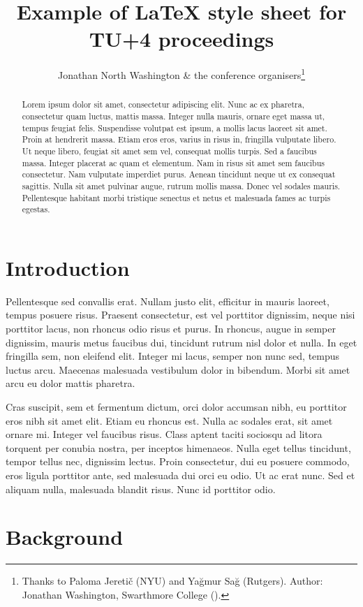 \documentclass[12pt,letterpaper]{article}
\title{Example of \LaTeX{} style sheet for TU+4 proceedings}
\author{Jonathan North Washington \& the conference organisers\thanks{
	Thanks to Paloma Jeretič (NYU) and Yağmur Sağ (Rutgers).
	Author: Jonathan Washington, Swarthmore College (\email{jonathan.washington@swarthmore.edu}).
}}
\begin{document}
\maketitle

\begin{abstract}
Lorem ipsum dolor sit amet, consectetur adipiscing elit. Nunc ac ex pharetra, consectetur quam luctus, mattis massa. Integer nulla mauris, ornare eget massa ut, tempus feugiat felis. Suspendisse volutpat est ipsum, a mollis lacus laoreet sit amet. Proin at hendrerit massa. Etiam eros eros, varius in risus in, fringilla vulputate libero. Ut neque libero, feugiat sit amet sem vel, consequat mollis turpis. Sed a faucibus massa. Integer placerat ac quam et elementum. Nam in risus sit amet sem faucibus consectetur. Nam vulputate imperdiet purus. Aenean tincidunt neque ut ex consequat sagittis. Nulla sit amet pulvinar augue, rutrum mollis massa. Donec vel sodales mauris. Pellentesque habitant morbi tristique senectus et netus et malesuada fames ac turpis egestas.
\end{abstract}


\section{Introduction}

Pellentesque sed convallis erat. Nullam justo elit, efficitur in mauris laoreet, tempus posuere risus. Praesent consectetur, est vel porttitor dignissim, neque nisi porttitor lacus, non rhoncus odio risus et purus. In rhoncus, augue in semper dignissim, mauris metus faucibus dui, tincidunt rutrum nisl dolor et nulla. In eget fringilla sem, non eleifend elit. Integer mi lacus, semper non nunc sed, tempus luctus arcu. Maecenas malesuada vestibulum dolor in bibendum. Morbi sit amet arcu eu dolor mattis pharetra.

Cras suscipit, sem et fermentum dictum, orci dolor accumsan nibh, eu porttitor eros nibh sit amet elit. Etiam eu rhoncus est. Nulla ac sodales erat, sit amet ornare mi. Integer vel faucibus risus. Class aptent taciti sociosqu ad litora torquent per conubia nostra, per inceptos himenaeos. Nulla eget tellus tincidunt, tempor tellus nec, dignissim lectus. Proin consectetur, dui eu posuere commodo, eros ligula porttitor ante, sed malesuada dui orci eu odio. Ut ac erat nunc. Sed et aliquam nulla, malesuada blandit risus. Nunc id porttitor odio.

\section{Background}
\end{document}
